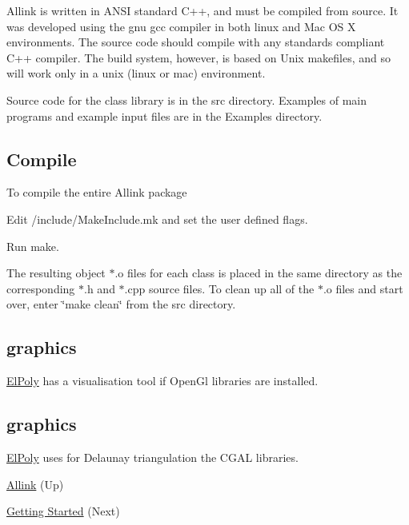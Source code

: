 Allink is written in A\+N\+SI standard C++, and must be compiled from source. It was developed using the gnu gcc compiler in both linux and Mac OS X environments. The source code should compile with any standards compliant C++ compiler. The build system, however, is based on Unix makefiles, and so will work only in a unix (linux or mac) environment.

Source code for the class library is in the src directory. Examples of main programs and example input files are in the Examples directory.\hypertarget{compile_page_compile_library_section}{}\subsection{Compile}\label{compile_page_compile_library_section}
To compile the entire Allink package 
\begin{DoxyItemize}
\item Edit /include/\+Make\+Include.mk and set the user defined flags. 
\item Run make.   
\end{DoxyItemize}

The resulting object $\ast$.o files for each class is placed in the same directory as the corresponding $\ast$.h and $\ast$.cpp source files. To clean up all of the $\ast$.o files and start over, enter \char`\"{}make clean\char`\"{} from the src directory.\hypertarget{compile_page_enable}{}\subsection{graphics}\label{compile_page_enable}
\hyperlink{classElPoly}{El\+Poly} has a visualisation tool if Open\+Gl libraries are installed. \hypertarget{compile_page_enable}{}\subsection{graphics}\label{compile_page_enable}
\hyperlink{classElPoly}{El\+Poly} uses for Delaunay triangulation the C\+G\+AL libraries.


\begin{DoxyItemize}
\item \hyperlink{index}{Allink} (Up)  
\item \hyperlink{usage_page}{Getting Started} (Next)  
\end{DoxyItemize}